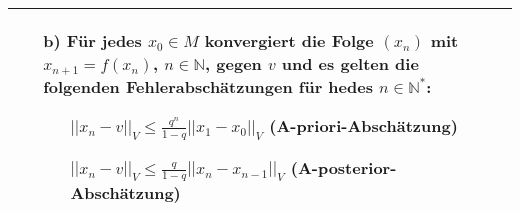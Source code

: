 \begin{table}[H]
\begin{tabularx}{\textwidth}{X m{16cm}}
\begin{itemize}[topsep=-0.5cm]
                \item[b)] Für jedes $x_0 \in M$ konvergiert die Folge $(x_n)$ mit $x_{n+1} = f(x_n)$, $n \in \mathbb{N}$, gegen $v$
                            und es gelten die folgenden Fehlerabschätzungen für hedes $n \in \mathbb{N^*}$:
                            \begin{itemize}[topsep=-0.5cm]
                                \item[] $||x_n-v||_V \leq \frac{q^n}{1-q}||x_1-x_0||_V$ (A-priori-Abschätzung)
                                \item[] $||x_n-v||_V \leq \frac{q}{1-q}||x_n-x_{n-1}||_V$ (A-posterior-Abschätzung)
                            \end{itemize}
            \end{itemize} \vspace{-0cm} \\

    \bottomrule
\end{tabularx}
\end{table}

